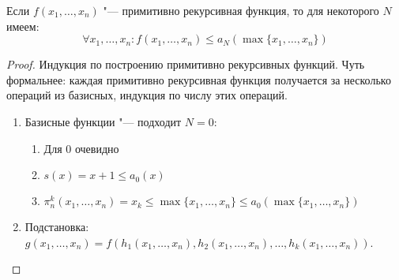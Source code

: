 \begin{theorem}
	Если $f(x_1, \dots, x_n)$ "--- примитивно рекурсивная функция, то для некоторого $N$ имеем:
	\[ \forall x_1, \dots, x_n \colon f(x_1, \dots, x_n) \le a_N(\max \{ x_1, \dots, x_n \}) \]
\end{theorem}
\begin{proof}
	Индукция по построению примитивно рекурсивных функций.
	Чуть формальнее: каждая примитивно рекурсивная функция получается за несколько операций из базисных,
	индукция по числу этих операций.
	\begin{enumerate}
	\item Базисные функции "--- подходит $N=0$:
		\begin{enumerate}
		\item Для $0$ очевидно
		\item $s(x) = x + 1 \le a_0(x)$
		\item $\pi_n^k(x_1, \dots, x_n) = x_k \le \max \{ x_1, \dots, x_n \} \le a_0(\max \{ x_1, \dots, x_n \})$
		\end{enumerate}
	\item
		Подстановка: $g(x_1, \dots, x_n) = f(h_1(x_1, \dots, x_n), h_2(x_1, \dots, x_n), \dots, h_k(x_1, \dots, x_n))$.


\end{enumerate}
\end{proof}
